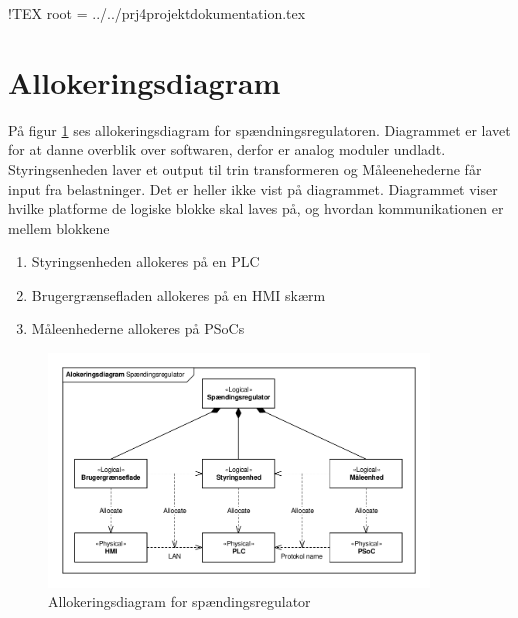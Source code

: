!TEX root = ../../prj4projektdokumentation.tex

\section{Allokeringsdiagram}
På figur \ref{fig:Allokering} ses allokeringsdiagram for spændningsregulatoren. Diagrammet er lavet for at danne overblik over softwaren, derfor er analog moduler undladt. Styringsenheden laver et output til trin transformeren og Måleenehederne får input fra belastninger. Det er heller ikke vist på diagrammet. Diagrammet viser hvilke platforme de logiske blokke skal laves på, og hvordan kommunikationen er mellem blokkene

\begin{enumerate}
	\item Styringsenheden allokeres på en PLC
	\item Brugergrænsefladen allokeres på en HMI skærm
	\item Måleenhederne allokeres på PSoCs
\end{enumerate}   

\begin{figure}[htbp] %
	\centering
	\includegraphics[width=0.9\textwidth]{Figure/Allokering}
	\caption{Allokeringsdiagram for spændingsregulator}
	\label{fig:Allokering}
\end{figure}

\newpage
